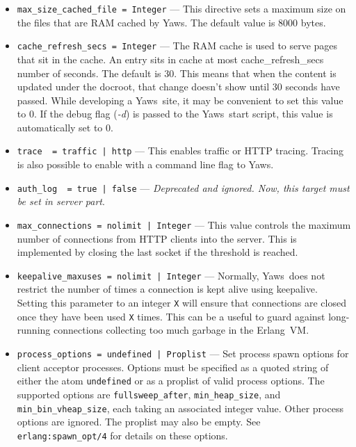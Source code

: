 \documentclass[11pt,oneside,english]{book}
\newcommand{\Erlang}            %
        {{\sc Erlang}}
\newcommand{\Yaws}            %
        {{\sc Yaws}}
\begin{document}
\begin{itemize}
\item        \verb+max_size_cached_file = Integer+ ---
              This  directive  sets  a  maximum size on the files
              that are RAM cached by \Yaws{}.  The default value is
              8000 bytes.

\item        \verb+cache_refresh_secs = Integer+ ---
              The  RAM  cache  is used to serve pages that sit in
              the  cache.  An  entry  sits  in  cache   at   most
              cache\_refresh\_secs  number  of seconds. The default
              is 30. This means that when the content is  updated
              under  the  docroot, that change doesn't show until
              30 seconds have passed.  While  developing  a  \Yaws\
              site,  it may be convenient to set this value to 0.
              If the debug flag (\textit{-d}) is passed to the
              \Yaws\   start script, this value is automatically set
              to 0.

\item        \verb+trace  = traffic | http+ ---
              This  enables  traffic  or HTTP tracing. Tracing is
              also possible to enable with a command line flag to
              \Yaws{}.

\item        \verb+auth_log  = true | false+ ---
              \textit{Deprecated and ignored. Now, this target must be set in
                server part}.

\item        \verb+max_connections = nolimit | Integer+ ---
              This value controls the maximum number of connections
              from HTTP clients into the server. This is implemented
              by closing the last socket if the threshold is reached.

\item        \verb+keepalive_maxuses = nolimit | Integer+ ---
              Normally, \Yaws\ does not restrict the number of times a
              connection is kept alive using keepalive. Setting this
              parameter to an integer \verb+X+ will ensure that
              connections are closed once they have been used \verb+X+
              times.  This can be a useful to guard against
              long-running connections collecting too much garbage in
              the \Erlang\ VM.

\item        \verb+process_options = undefined | Proplist+ ---
              Set process spawn options for client acceptor processes.
              Options must be specified as a quoted string of either
              the atom \verb+undefined+ or as a proplist of valid
              process options. The supported options are
              \verb+fullsweep_after+, \verb+min_heap_size+, and
              \verb+min_bin_vheap_size+, each taking an associated
              integer value. Other process options are ignored. The
              proplist may also be empty. See
              \verb+erlang:spawn_opt/4+ for details on these options.


\end{itemize}
\end{document}
